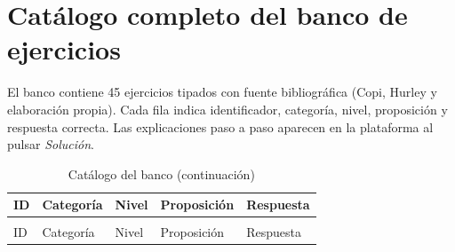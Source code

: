 \documentclass[11pt,a4paper,openany]{book}
\begin{document}
\chapter{Cat\'alogo completo del banco de ejercicios}
\label{ch:banco80}
El banco contiene 45 ejercicios tipados con fuente bibliogr\'afica (Copi, Hurley y elaboraci\'on propia). Cada fila indica identificador, categor\'ia, nivel, proposici\'on y respuesta correcta. Las explicaciones paso a paso aparecen en la plataforma al pulsar \textit{Soluci\'on}.
\begin{center}
\begin{longtable}{lllll}
\caption{Cat\'alogo del banco (45 ejercicios registrados)} \\
\toprule
ID & Categor\'ia & Nivel & Proposici\'on & Respuesta \\
\midrule
\endfirsthead
\caption{Cat\'alogo del banco (continuaci\'on)} \\
\toprule
ID & Categor\'ia & Nivel & Proposici\'on & Respuesta \\
\midrule
\endhead


\end{longtable}
\end{center}
\end{document}
